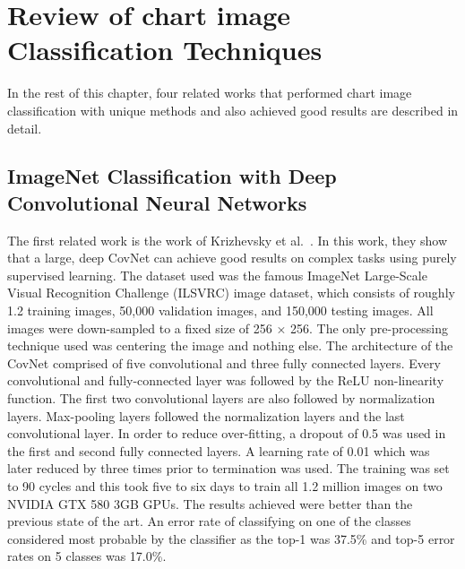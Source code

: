 \documentclass[12pt, a4paper,oneside]{report}
\begin{document}
\section{Review of chart image Classification Techniques}
In the rest of this chapter, four related works that performed chart image classification with unique methods and also achieved good results are described in detail.  

\subsection{ImageNet Classification with Deep Convolutional Neural Networks}
The first related work is the work of Krizhevsky et al.~\cite{krizhevsky2012imagenet}. In this work, they show that a large, deep CovNet can achieve good results on complex tasks using purely supervised learning. The dataset used was the famous ImageNet Large-Scale Visual Recognition Challenge (ILSVRC) image dataset, which consists of roughly 1.2 training images, 50,000 validation images, and 150,000 testing images. All images were down-sampled to a fixed size of 256 × 256. The only pre-processing technique used was centering the image and nothing else. The architecture of the CovNet comprised of five convolutional and three fully connected layers. Every convolutional and fully-connected layer was followed by the ReLU
non-linearity function. The first two convolutional layers are also followed by normalization layers. Max-pooling layers followed the normalization layers and the last convolutional layer. In order to reduce over-fitting, a dropout of 0.5 was used in the first and second fully connected layers. A learning rate of 0.01 which was later reduced by three times prior to termination was used. The training was set to 90 cycles and this took five to six days to train all 1.2 million images on two NVIDIA GTX 580 3GB GPUs. The results achieved were better than the previous state of the art. An error rate of classifying on one of the classes considered most probable by the classifier as the top-1 was 37.5\% and top-5 error rates on 5 classes was 17.0\%.
\end{document}
